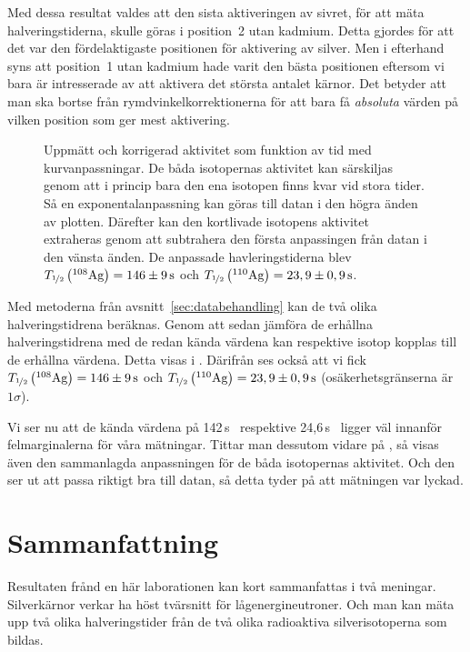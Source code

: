 \documentclass[11pt,a4paper, english, swedish
]{article}
\newcommand{\Thalv}[2]{\ensuremath{}T_{\nicefrac{1}{2}}\left(^{#1}\text{#2}\right)}
\begin{document}
Med dessa resultat valdes att den sista aktiveringen av sivret, för att mäta halveringstiderna, skulle göras i position~2 utan kadmium. Detta gjordes för att det var den fördelaktigaste positionen för aktivering av silver. Men i efterhand syns att position~1 utan kadmium hade varit den bästa positionen eftersom vi bara är intresserade av att aktivera det största antalet kärnor. Det betyder att man ska bortse från rymdvinkelkorrektionerna för att bara få \emph{absoluta} värden på vilken position som ger mest aktivering. 


\begin{figure}\centering

\caption{Uppmätt och korrigerad aktivitet som funktion av tid med
  kurvanpassningar. De båda isotopernas aktivitet kan särskiljas genom
att i princip bara den ena isotopen finns kvar vid stora tider. Så en
exponentalanpassning kan göras till datan i den högra änden av
plotten. Därefter kan den kortlivade isotopens aktivitet extraheras
genom att subtrahera den första anpassingen från datan i den vänsta
änden. De anpassade havleringstiderna blev
$\Thalv{108}{Ag}=\unit[146\pm9]{s}$ och $\Thalv{110}{Ag}=\unit[23,9\pm0,9]{s}$.}
\label{fig:data}
\end{figure}

Med metoderna från avsnitt~\ref{sec:databehandling} kan de två olika halveringstidrena beräknas. Genom att sedan jämföra de erhållna halveringstidrena med de redan kända värdena kan respektive isotop kopplas till de erhållna värdena. Detta visas i . Därifrån ses också att vi fick $\Thalv{108}{Ag}=\unit[146\pm9]{s}$ och $\Thalv{110}{Ag}=\unit[23,9\pm0,9]{s}$ (osäkerhetsgränserna är $1\sigma$).

Vi ser nu att de kända värdena på 142\,s~\cite{wiki_silver} respektive 24,6\,s~\cite{wiki_silver} ligger väl innanför felmarginalerna för våra mätningar. 
Tittar man dessutom vidare på , så visas även den sammanlagda anpassningen för de båda isotopernas aktivitet. Och den ser ut att passa riktigt bra till datan, så detta tyder på att mätningen var lyckad.



\section{Sammanfattning}
Resultaten frånd en här laborationen kan kort sammanfattas i två meningar. Silverkärnor verkar ha höst tvärsnitt för lågenergineutroner. Och man kan mäta upp två olika halveringstider från de två olika radioaktiva silverisotoperna som bildas.
\end{document}

